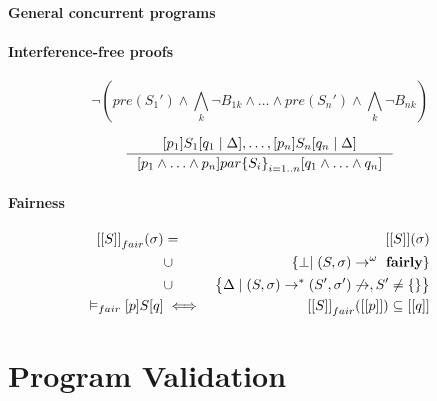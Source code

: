 \documentclass[12pt, a4paper]{book}
\begin{document}
  \subsubsection{General concurrent programs}
  \label{subs:General concurrent programs}
  \subsubsection{Interference-free proofs}
  \label{subs:Interference-free proofs}

  $$
  \lnot(pre(S_1') \land \bigwedge_k \lnot B_{1k} \land \ldots \land pre(S_n') \land \bigwedge_k \lnot B_{nk})
  $$

  $$
  \inference{[p_1] S_1[q_1 \mid \Delta], \ldots, [p_n] S_n [q_n\mid\Delta]}
  {[p_1 \land \ldots \land p_n] par{\{S_i\}}_{i=1..n} [q_1 \land \ldots \land q_n]}
  $$

  \subsubsection{Fairness}
  \label{subs:Fairness}

  

  \begin{eqnarray*}
      {[[S]]}_{fair}(\sigma) & = & [[S]](\sigma) \\
      & \cup & \{ \perp \mid (S,\sigma) \rightarrow^{\omega}\textrm{ \textbf{fairly}}\} \\
      & \cup & \big\lbrace \Delta \mid (S,\sigma) \rightarrow^{*} (S',\sigma') \not\rightarrow, S' \neq \{\} \big\rbrace \\
      \vDash_{fair} [p] S [q] & \iff & {[[S]]}_{fair}([[p]]) \subseteq [[q]]
  \end{eqnarray*}



  \chapter{Program Validation}
  \label{chap:Program Validation}

\end{document}
